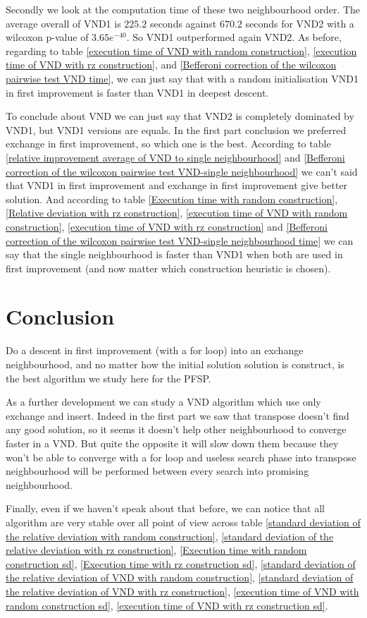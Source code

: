 \documentclass[12pt,a4paper]{article}
\begin{document}
Secondly we look at the computation time of these two neighbourhood order. The average overall of VND1 is $225.2$ seconds against $670.2$ seconds for VND2 with a wilcoxon p-value of $3.65e^{-40}$. So VND1 outperformed again VND2. As before, regarding to table \ref{execution time of VND with random construction}, \ref{execution time of VND with rz construction}, and \ref{Befferoni correction of the wilcoxon pairwise test VND time}, we can just say that with a random initialisation VND1 in first improvement is faster than VND1 in deepest descent.

To conclude about VND we can just say that VND2 is completely dominated by VND1, but VND1 versions are equals. In the first part conclusion we preferred exchange in first improvement, so which one is the best. According to table \ref{relative improvement average of VND to single neighbourhood} and \ref{Befferoni correction of the wilcoxon pairwise test VND-single neighbourhood} we can't said that VND1 in first improvement and exchange in first improvement give better solution. And according to table \ref{Execution time with random construction}, \ref{Relative deviation with rz construction}, \ref{execution time of VND with random construction}, \ref{execution time of VND with rz construction} and \ref{Befferoni correction of the wilcoxon pairwise test VND-single neighbourhood time} we can say that the single neighbourhood is faster than VND1 when both are used in first improvement (and now matter which construction heuristic is chosen).
 
\section{Conclusion}

Do a descent in first improvement (with a for loop) into an exchange neighbourhood, and no matter how the initial solution solution is construct, is the best algorithm we study here for the PFSP.

As a further development we can study a VND algorithm which use only exchange and insert. Indeed in the first part we saw that transpose doesn't find any good solution, so it seems it doesn't help other neighbourhood to converge faster in a VND. But quite the opposite it will slow down them because they won't be able to converge with a for loop and useless search phase into transpose neighbourhood will be performed between every search into promising neighbourhood.

Finally, even if we haven't speak about that before, we can notice that all algorithm are very stable over all point of view across table \ref{standard deviation of the relative deviation with random construction}, \ref{standard deviation of the relative deviation with rz construction}, \ref{Execution time with random construction sd}, \ref{Execution time with rz construction sd}, \ref{standard deviation of the relative deviation of VND with random construction}, \ref{standard deviation of the relative deviation of VND with rz construction}, \ref{execution time of VND with random construction sd}, \ref{execution time of VND with rz construction sd}.
\end{document}
